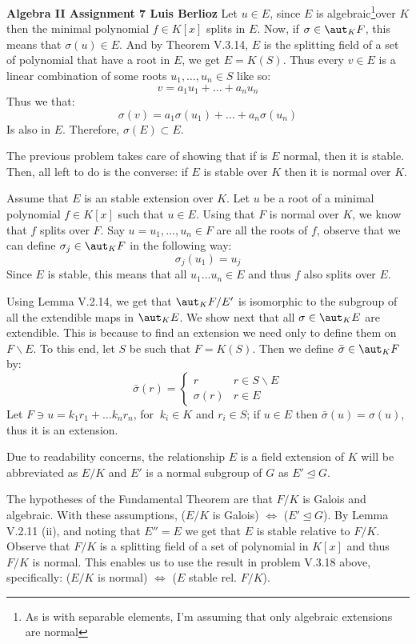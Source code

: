 \noindent\textbf{Algebra II Assignment 7 \hspace{\fill} Luis Berlioz}
Let $u\in E$, since $E$ is algebraic\footnote{As is with separable elements, I'm assuming that only algebraic extensions are normal}over $K$ then the minimal polynomial $f\in K[x]$ splits in $E$. Now, if $\sigma\in \aut_KF$, this means that $\sigma(u)\in E$. And by Theorem V.3.14, $E$ is the splitting field of a set of polynomial that have a root in $E$, we get $E=K(S)$. Thus every $v\in E$ is a linear combination of some roots $u_1,\ldots, u_n\in S$ like so:
$$v=a_1u_1+\ldots+a_n u_n$$
Thus we that:
$$\sigma(v)=a_1\sigma(u_1)+\ldots+a_n \sigma(u_n)$$
Is also in $E$. Therefore, $\sigma(E)\subset E$.

The previous problem takes care of showing that if is  $E$ normal, then it is stable. Then, all left to do is the converse: if $E$ is stable over $K$ then it is normal over $K$. 

Assume that $E$ is an stable extension over $K$.  Let $u$ be a root of a minimal polynomial $f\in K[x]$ such that $u\in E$. Using that $F$ is normal over $K$, we know that $f$ splits over $F$. Say $u=u_1,\ldots,u_n\in F$ are all the roots of $f$, observe that we can define $\sigma_j\in \aut_KF$ in the following way:
 $$\sigma_j(u_1)= u_j$$
Since $E$ is stable, this means that all $u_1\ldots u_n\in E$ and thus $f$ also splits over $E$.

Using Lemma V.2.14, we get that $\aut_KF/E'$ is isomorphic to the subgroup of all the extendible maps in $\aut_KE$.  We show next  that all $\sigma \in \aut_K E$  are extendible. This is because to find an extension we need only to define them on $F\backslash E$. To this end, let $S$ be such that $F=K(S)$. Then we define $\bar\sigma\in \aut_KF$ by:
$$\bar\sigma(r) =\begin{cases}
r & r\in S\backslash E\\
\sigma(r) & r \in E
\end{cases}$$
Let $F\ni u=k_1 r_1 + \ldots k_n r_n$, for $\ k_i\in K$ and $r_i\in S$; if $u\in E$ then $\bar\sigma(u)= \sigma(u) $, thus it is an extension.

Due to readability concerns, the relationship $E$ is a field extension of $K$ will be abbreviated as $E/K$ and $E'$ is a normal subgroup of $G$ as $E'\unlhd G$.

The hypotheses of the Fundamental Theorem are that $F/K$ is Galois and algebraic. With these assumptions, ($E/K$ is Galois) $\iff$ ($E'\unlhd G$). By Lemma V.2.11 (ii), and noting that $E'' = E$ we get that $E$ is stable relative to $F/K$. Observe that $F/K$ is a splitting field of a set of polynomial in $K[x]$ and thus $F/K$ is normal. This enables us to use the result in problem V.3.18 above, specifically: ($E/K$ is normal) $\iff$ ($E$ stable rel. $F/K$).

